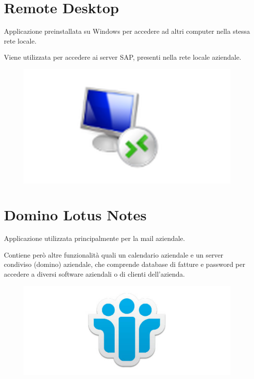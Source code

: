 \newpage

\section{Remote Desktop}
\begin{flushleft}
	Applicazione preinstallata su Windows per accedere ad altri computer nella stessa rete locale.
	
	Viene utilizzata per accedere ai server SAP, presenti nella rete locale aziendale.
\end{flushleft}
\begin{figure}[!h] 
	\centering
	\includegraphics[scale = 0.5]{immagini/tecnologie/remote-desktop}
\end{figure}

\section{Domino Lotus Notes}
\begin{flushleft}
	Applicazione utilizzata principalmente per la mail aziendale.
	
	Contiene però altre funzionalità quali un calendario aziendale e un server condiviso (domino) aziendale, che comprende database di fatture e password per accedere a diversi software aziendali o di clienti dell'azienda.
\end{flushleft}

\begin{figure}[!h] 
	\centering
	\includegraphics[scale = 0.5]{immagini/tecnologie/domino-lotus-notes.png}
\end{figure}
